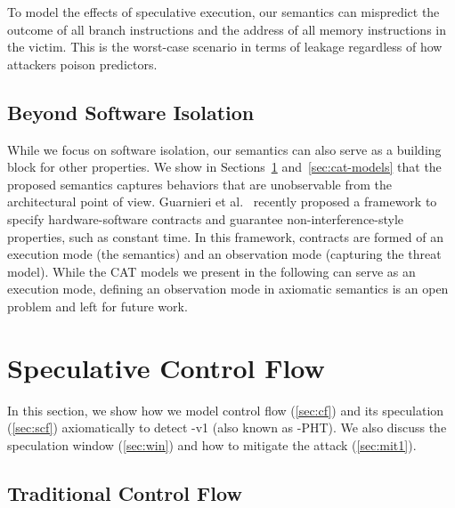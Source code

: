 \documentclass[conference]{IEEEtran}
\begin{document}
To model the effects of speculative execution, our semantics can mispredict the outcome of all branch instructions and the address of all memory instructions in the victim.
This is the worst-case scenario in terms of leakage regardless of how attackers poison predictors.

\subsection{Beyond Software Isolation}
\label{sec:beyond-isolation}

While we focus on software isolation, our semantics can also serve as a building block for other properties. 
We show in Sections~\ref{sec:semantics} and~\ref{sec:cat-models} that the proposed semantics captures behaviors that are unobservable from the architectural point of view.
Guarnieri et al.~\cite{speculative-contracts} recently proposed a framework to specify hardware-software contracts and guarantee non-interference-style properties, such as constant time.
In this framework, contracts are formed of an execution mode (the semantics) and an observation mode (capturing the threat model). 
While the CAT models we present in the following can serve as an execution mode, defining an observation mode in axiomatic semantics is an open problem and left for future work.

\section{Speculative Control Flow}
\label{sec:semantics}

In this section, we show how we model control flow (\autoref{sec:cf}) and its speculation (\autoref{sec:scf}) axiomatically to detect \spectre-v1 (also known as \spectre-\textsc{PHT}).
We also discuss the speculation window (\autoref{sec:win}) and how to mitigate the attack (\autoref{sec:mit1}).

\subsection{Traditional Control Flow}
\label{sec:cf}
\end{document}
